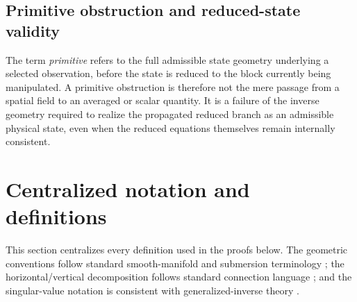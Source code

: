 \documentclass[12pt]{article}
\begin{document}
\subsection{Primitive obstruction and reduced-state validity}
The term \emph{primitive} refers to the full admissible state geometry underlying a selected observation, before the state is reduced to the block currently being manipulated. A primitive obstruction is therefore not the mere passage from a spatial field to an averaged or scalar quantity. It is a failure of the inverse geometry required to realize the propagated reduced branch as an admissible physical state, even when the reduced equations themselves remain internally consistent.

\section{Centralized notation and definitions}\label{sec:notationdefs}
This section centralizes every definition used in the proofs below. The geometric conventions follow standard smooth-manifold and submersion terminology \cite{Lee}; the horizontal/vertical decomposition follows standard connection language \cite{KobayashiNomizu}; and the singular-value notation is consistent with generalized-inverse theory \cite{BenIsraelGreville}.
\end{document}
